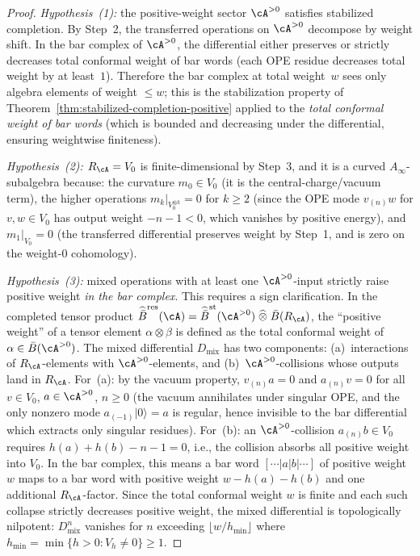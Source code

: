 \begin{proof}
\emph{Hypothesis~(1):} the positive-weight sector $\cA^{>0}$
satisfies stabilized completion.  By Step~2, the transferred
operations on $\cA^{>0}$ decompose by weight shift.  In the
bar complex of $\cA^{>0}$, the differential either preserves
or strictly decreases total conformal weight of bar words
(each OPE residue decreases total weight by at least~$1$).
Therefore the bar complex at total weight~$w$ sees only
algebra elements of weight $\le w$; this is the stabilization
property of
Theorem~\ref{thm:stabilized-completion-positive} applied to
the \emph{total conformal weight of bar words} (which is
bounded and decreasing under the differential, ensuring
weightwise finiteness).

\emph{Hypothesis~(2):} $R_\cA = V_0$ is finite-dimensional
by Step~3, and it is a curved $A_\infty$-subalgebra because:
the curvature $m_0 \in V_0$ (it is the central-charge/vacuum
term), the higher operations $m_k|_{V_0^{\otimes k}} = 0$ for
$k \ge 2$ (since the OPE mode $v_{(n)}w$ for $v, w \in V_0$
has output weight $-n-1 < 0$, which vanishes by positive
energy), and $m_1|_{V_0} = 0$ (the transferred differential
preserves weight by Step~1, and is zero on the weight-$0$
cohomology).

\emph{Hypothesis~(3):} mixed operations with at least one
$\cA^{>0}$-input strictly raise positive weight \emph{in the
bar complex}.  This requires a sign clarification.  In the
completed tensor product
$\widehat{\bar B}^{\mathrm{res}}(\cA) =
\widehat{\bar B}^{\mathrm{st}}(\cA^{>0}) \;\widehat{\otimes}\;
\bar B(R_\cA)$,
the ``positive weight'' of a tensor element
$\alpha \otimes \beta$ is defined as the total conformal
weight of $\alpha \in \bar B(\cA^{>0})$.  The mixed
differential $D_{\mathrm{mix}}$ has two components:
(a)~interactions of $R_\cA$-elements with
$\cA^{>0}$-elements, and
(b)~$\cA^{>0}$-collisions whose outputs land in $R_\cA$.
For~(a): by the vacuum property, $v_{(n)}a = 0$ and
$a_{(n)}v = 0$ for all $v \in V_0$, $a \in \cA^{>0}$,
$n \ge 0$ (the vacuum annihilates under singular OPE, and the
only nonzero mode $a_{(-1)}|0\rangle = a$ is regular, hence
invisible to the bar differential which extracts only singular
residues).  For~(b): an $\cA^{>0}$-collision
$a_{(n)}b \in V_0$ requires $h(a) + h(b) - n - 1 = 0$,
i.e., the collision absorbs all positive weight into
$V_0$.  In the bar complex, this means a bar word
$[\cdots | a | b | \cdots]$ of positive weight~$w$ maps to a
bar word with positive weight $w - h(a) - h(b)$ and one
additional $R_\cA$-factor.  Since the total conformal weight
$w$ is finite and each such collapse strictly decreases
positive weight, the mixed differential is topologically
nilpotent: $D_{\mathrm{mix}}^n$ vanishes for $n$ exceeding
$\lfloor w / h_{\min} \rfloor$ where
$h_{\min} = \min\{h > 0 : V_h \ne 0\} \ge 1$.


\end{proof}
